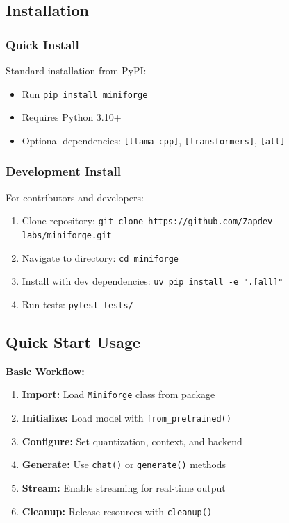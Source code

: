 \subsection{Installation}

\subsubsection{Quick Install}

Standard installation from PyPI:
\begin{itemize}
    \item Run \texttt{pip install miniforge}
    \item Requires Python 3.10+
    \item Optional dependencies: \texttt{[llama-cpp]}, \texttt{[transformers]}, \texttt{[all]}
\end{itemize}

\subsubsection{Development Install}

For contributors and developers:
\begin{enumerate}
    \item Clone repository: \texttt{git clone https://github.com/Zapdev-labs/miniforge.git}
    \item Navigate to directory: \texttt{cd miniforge}
    \item Install with dev dependencies: \texttt{uv pip install -e ".[all]"}
    \item Run tests: \texttt{pytest tests/}
\end{enumerate}

\subsection{Quick Start Usage}

\textbf{Basic Workflow:}
\begin{enumerate}
    \item \textbf{Import:} Load \texttt{Miniforge} class from package
    \item \textbf{Initialize:} Load model with \texttt{from\_pretrained()}
    \item \textbf{Configure:} Set quantization, context, and backend
    \item \textbf{Generate:} Use \texttt{chat()} or \texttt{generate()} methods
    \item \textbf{Stream:} Enable streaming for real-time output
    \item \textbf{Cleanup:} Release resources with \texttt{cleanup()}
\end{enumerate}

